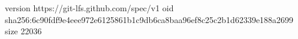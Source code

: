 version https://git-lfs.github.com/spec/v1
oid sha256:6c90fdf9e4eee972e6125861b1c9db6ca8baa96ef8c25c2b1d62339e188a2699
size 22036
